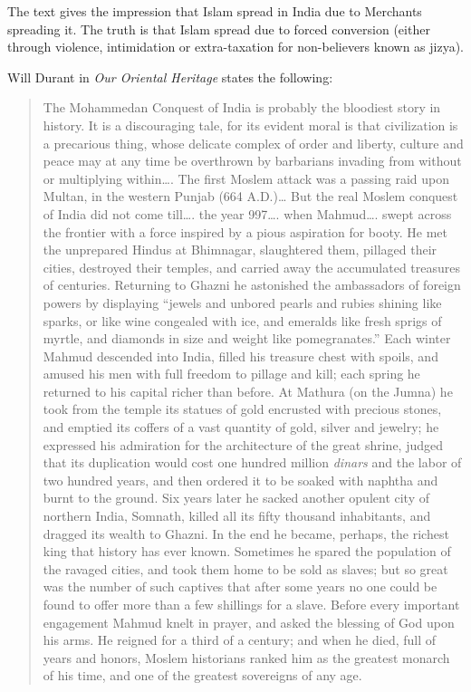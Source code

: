 The text gives the impression that Islam spread in India due to Merchants spreading it. The truth is that Islam spread due to forced conversion (either through violence, intimidation or extra-taxation for non-believers known as jizya). 

Will Durant in \textit{Our Oriental Heritage} states the following:
\begin{quotation}
\noindent The Mohammedan Conquest of India is probably the bloodiest story in history. It is a discouraging tale, for its evident moral is that civilization is a precarious thing, whose delicate complex of order and liberty, culture and peace may at any time be overthrown by barbarians invading from without or multiplying within…. The first Moslem attack was a passing raid upon Multan, in the western Punjab (664 A.D.)… But the real Moslem conquest of India did not come till…. the year 997…. when Mahmud…. swept across the frontier with a force inspired by a pious aspiration for booty. He met the unprepared Hindus at Bhimnagar, slaughtered them, pillaged their cities, destroyed their temples, and carried away the accumulated treasures of centuries. Returning to Ghazni he astonished the ambassadors of foreign powers by displaying “jewels and unbored pearls and rubies shining like sparks, or like wine congealed with ice, and emeralds like fresh sprigs of myrtle, and diamonds in size and weight like pomegranates.” Each winter Mahmud descended into India, filled his treasure chest with spoils, and amused his men with full freedom to pillage and kill; each spring he returned to his capital richer than before. At Mathura (on the Jumna) he took from the temple its statues of gold encrusted with precious stones, and emptied its coffers of a vast quantity of gold, silver and jewelry; he expressed his admiration for the architecture of the great shrine, judged that its duplication would cost one hundred million \textit{dinars} and the labor of two hundred years, and then ordered it to be soaked with naphtha and burnt to the ground. Six years later he sacked another opulent city of northern India, Somnath, killed all its fifty thousand inhabitants, and dragged its wealth to Ghazni. In the end he became, perhaps, the richest king that history has ever known. Sometimes he spared the population of the ravaged cities, and took them home to be sold as slaves; but so great was the number of such captives that after some years no one could be found to offer more than a few shillings for a slave. Before every important engagement Mahmud knelt in prayer, and asked the blessing of God upon his arms. He reigned for a third of a century; and when he died, full of years and honors, Moslem historians ranked him as the greatest monarch of his time, and one of the greatest sovereigns of any age.
\medskip


\end{quotation}
